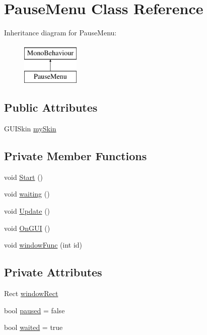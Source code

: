 \hypertarget{class_pause_menu}{\section{Pause\-Menu Class Reference}
\label{class_pause_menu}
}
Inheritance diagram for Pause\-Menu\-:\begin{figure}[H]
\begin{center}
\leavevmode
\includegraphics[height=2.000000cm]{class_pause_menu}
\end{center}
\end{figure}
\subsection*{Public Attributes}
\begin{DoxyCompactItemize}
\item 
G\-U\-I\-Skin \hyperlink{class_pause_menu_af78d9844a86f8ffb0ebf4d711fe0c2ce}{my\-Skin}
\end{DoxyCompactItemize}
\subsection*{Private Member Functions}
\begin{DoxyCompactItemize}
\item 
void \hyperlink{class_pause_menu_a5325fe2fbc7a7d39408b6dab0a129c88}{Start} ()
\item 
void \hyperlink{class_pause_menu_a54ec674db33aad0505f69ca1433b9f69}{waiting} ()
\item 
void \hyperlink{class_pause_menu_ad66a0552c131257182ce524f1c71ce4c}{Update} ()
\item 
void \hyperlink{class_pause_menu_a2fbdab78365444f12e592144a336dcc8}{On\-G\-U\-I} ()
\item 
void \hyperlink{class_pause_menu_a9e4a263a0bbdfb0e1476ac04d101dfde}{window\-Func} (int id)
\end{DoxyCompactItemize}
\subsection*{Private Attributes}
\begin{DoxyCompactItemize}
\item 
Rect \hyperlink{class_pause_menu_a5cbd090dfd1fd8cd9d745d1334dad5cb}{window\-Rect}
\item 
bool \hyperlink{class_pause_menu_a5ebc8c7d38ad3c1be68a741fb133e6a2}{paused} = false
\item 
bool \hyperlink{class_pause_menu_a73081e2e0173f8cda0bb890d4b84b722}{waited} = true
\end{DoxyCompactItemize}


